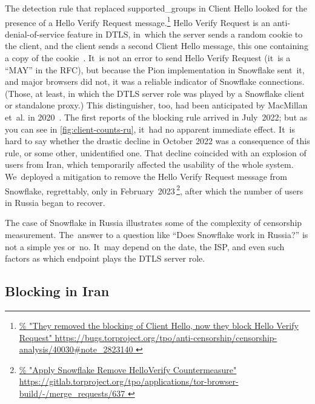 \documentclass[letterpaper,twocolumn]{article}
\newlength{\urlfootnotesize}
\newcommand{\urlfootnote}[1]{\footnote{
\raggedright\fontsize{\urlfootnotesize}{\urlfootnotesize}\selectfont\url{#1}
}}
\begin{document}
The detection rule that replaced \mbox{supported\_groups} in Client Hello
looked for the presence of a Hello Verify Request message.\urlfootnote{
https://bugs.torproject.org/tpo/anti-censorship/censorship-analysis/40030\#note_2823140
}
Hello Verify Request is an anti-denial-of-service feature in DTLS,
in~which the server sends a random cookie to the client,
and the client sends a second Client Hello message,
this one containing a copy of the cookie~\cite[\S 5.1]{rfc9147}.
It~is not an error to send Hello Verify Request
(it~is a ``MAY'' in the RFC),
but because the Pion implementation in Snowflake sent~it,
and major browsers did not,
it was a reliable indicator of Snowflake connections.
(Those, at least, in which the DTLS server role was played by
a Snowflake client or standalone proxy.)
This distinguisher, too, had been anticipated by
MacMillan et~al. in 2020~\cite[\S 3]{arxiv.2008.03254}.
The first reports of the blocking rule arrived in July~2022;
but as you can see in \autoref{fig:client-counts-ru},
it~had no apparent immediate effect.
It~is hard to say whether the drastic decline in October 2022
was a consequence of this rule,
or some other, unidentified one.
That decline coincided with an explosion of users from Iran,
which temporarily affected the usability of the whole system.
We~deployed a mitigation to remove the Hello Verify Request message
from Snowflake, regrettably, only in February~2023\,\urlfootnote{
https://gitlab.torproject.org/tpo/applications/tor-browser-build/-/merge_requests/637
}, %
after which the number of users in Russia began to recover.

The case of Snowflake in Russia illustrates
some of the complexity of censorship measurement.
The~answer to a question like ``Does Snowflake work in Russia?''
is not a simple yes or~no.
It~may depend on the date, the ISP,
and even such factors as which endpoint plays the DTLS server role.

\subsection{Blocking in Iran}
\label{sec:block-ir}

\end{document}
